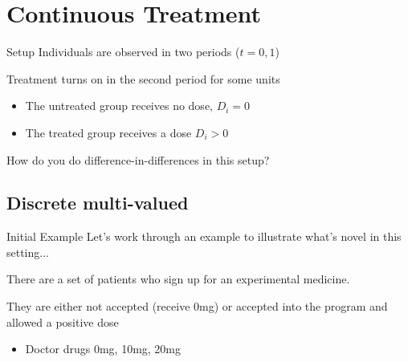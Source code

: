 \documentclass[aspectratio=43,t]{beamer}
\begin{document}
\section{Continuous Treatment}

\begin{frame}{Setup}
  Individuals are observed in two periods ($t = 0, 1$)

  \bigskip
  Treatment turns on in the second period for some units
  \begin{itemize}
    \item The untreated group receives no dose, $D_i = 0$

    \item The treated group receives a dose $D_i > 0$
  \end{itemize}

  \bigskip
  How do you do difference-in-differences in this setup?
\end{frame}

%
%

\subsection{Discrete multi-valued}

\begin{frame}{Initial Example}
  Let's work through an example to illustrate what's novel in this setting...

  \bigskip
  There are a set of patients who sign up for an experimental medicine.

  They are either not accepted (receive 0mg) or accepted into the program and allowed a positive dose
  \begin{itemize}
    \item Doctor drugs 0mg, 10mg, 20mg
  \end{itemize}

\end{frame}
\end{document}
